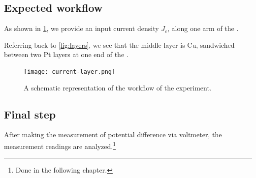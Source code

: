 \subsection{Expected workflow}

As shown in \cref{fig:layer-workflow}, we provide an input current density \( J_c \), along one arm of the \Hst.

Referring back to \cref{fig:layers}, we see that the middle layer is Cu, sandwiched between two Pt layers at one end of the \Hst.

\begin{figure}[h!]
    \centering
    \texttt{[image: current-layer.png]}
    \caption{A schematic representation of the workflow of the experiment.}
    \label{fig:layer-workflow}
\end{figure}




\subsection{Final step}

After making the measurement of potential difference via voltmeter, the measurement readings are analyzed.\footnote{Done in the following chapter.}

